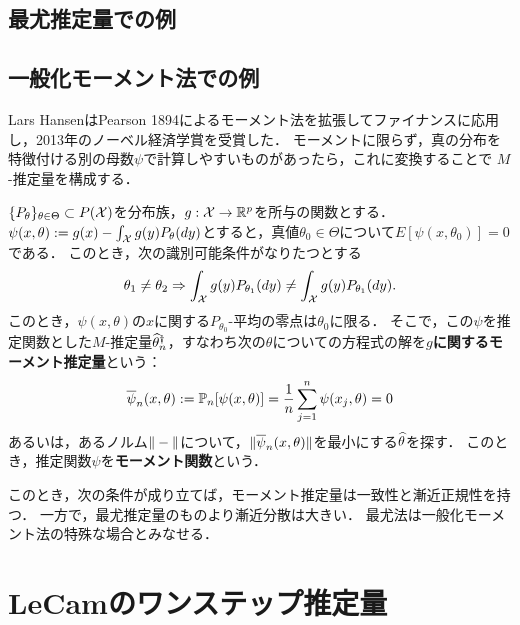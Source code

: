 \documentclass[uplatex,dvipdfmx]{jsreport}
\begin{document}
\subsection{最尤推定量での例}

\begin{theorem}[最尤推定量の漸近正規性の十分条件]\label{thm-ASN-of-MLE}
    
\end{theorem}

\subsection{一般化モーメント法での例}

\begin{tcolorbox}[colframe=ForestGreen, colback=ForestGreen!10!white,breakable,colbacktitle=ForestGreen!40!white,coltitle=black,fonttitle=\bfseries\sffamily,
title=]
    Lars HansenはPearson 1894によるモーメント法を拡張してファイナンスに応用し，2013年のノーベル経済学賞を受賞した．
    モーメントに限らず，真の分布を特徴付ける別の母数$\psi$で計算しやすいものがあったら，これに変換することで
    $M$-推定量を構成する．
\end{tcolorbox}

\begin{definition}
    $\{P_\theta\}_{\theta\in\Theta}\subset P(\mathcal{X})$を分布族，$g:\mathcal{X}\to\mathbb{R}^p$を所与の関数とする．
    $\psi(x,\theta):=g(x)-\int_{\mathcal{X}} g(y)P_\theta(dy)$とすると，真値$\theta_0\in\Theta$について$E[\psi(x,\theta_0)]=0$である．
    このとき，次の識別可能条件がなりたつとする
    \[\theta_1\ne\theta_2\Rightarrow\int_{\mathcal{X}} g(y)P_{\theta_1}(dy)\ne\int_{\mathcal{X}} g(y)P_{\theta_1}(dy).\]
    このとき，$\psi(x,\theta)$の$x$に関する$P_{\theta_0}$-平均の零点は$\theta_0$に限る．
    そこで，この$\psi$を推定関数とした$M$-推定量$\widehat{\theta}^\dagger_n$，すなわち次の$\theta$についての方程式の解を\textbf{$g$に関するモーメント推定量}という：
    \[\overline{\psi}_n(x,\theta):=\mathbb{P}_n[\psi(x,\theta)]=\frac{1}{n}\sum_{j=1}^n\psi(x_j,\theta)=0\]
    あるいは，あるノルム$\|-\|$について，$\|\overline{\psi}_n(x,\theta)\|$を最小にする$\widehat{\theta}$を探す．
    このとき，推定関数$\psi$を\textbf{モーメント関数}という．

    このとき，次の条件が成り立てば，モーメント推定量は一致性と漸近正規性を持つ．
    一方で，最尤推定量のものより漸近分散は大きい．
    最尤法は一般化モーメント法の特殊な場合とみなせる．
\end{definition}

\section{LeCamのワンステップ推定量}
\end{document}
